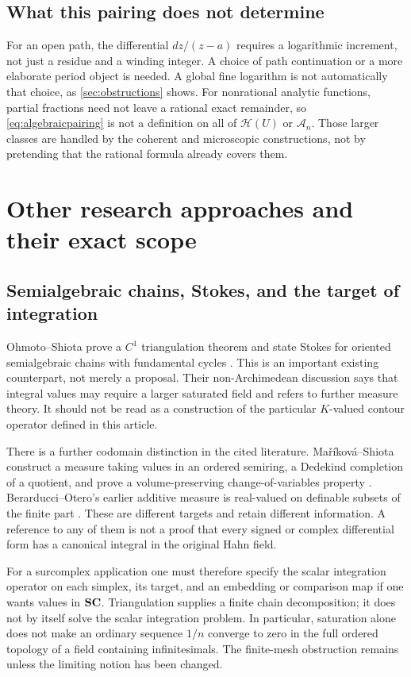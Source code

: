 \documentclass[11pt,letterpaper]{article}
\theoremstyle{definition}
\theoremstyle{remark}
\newcommand{\HH}{\mathcal H}\newcommand{\A}{\mathscr A}\newcommand{\OO}{\mathcal O}
\numberwithin{equation}{section}
\begin{document}
\subsection{What this pairing does not determine}
For an open path, the differential $dz/(z-a)$ requires a logarithmic increment, not just a residue and a winding integer. A choice of path continuation or a more elaborate period object is needed. A global fine logarithm is not automatically that choice, as \cref{sec:obstructions} shows. For nonrational analytic functions, partial fractions need not leave a rational exact remainder, so \eqref{eq:algebraicpairing} is not a definition on all of $\HH(U)$ or $\A_n$. Those larger classes are handled by the coherent and microscopic constructions, not by pretending that the rational formula already covers them.

\section{Other research approaches and their exact scope}\label{sec:alternatives}

\subsection{Semialgebraic chains, Stokes, and the target of integration}
Ohmoto--Shiota prove a $C^1$ triangulation theorem and state Stokes for oriented semialgebraic chains with fundamental cycles \cite[Theorem~4.1 and Proposition~4.2]{OS}. This is an important existing counterpart, not merely a proposal. Their non-Archimedean discussion says that integral values may require a larger saturated field and refers to further measure theory. It should not be read as a construction of the particular $K$-valued contour operator defined in this article.

There is a further codomain distinction in the cited literature. Ma\v r\'{i}kov\'{a}--Shiota construct a measure taking values in an ordered semiring, a Dedekind completion of a quotient, and prove a volume-preserving change-of-variables property \cite{MS}. Berarducci--Otero's earlier additive measure is real-valued on definable subsets of the finite part \cite{BOmeasure}. These are different targets and retain different information. A reference to any of them is not a proof that every signed or complex differential form has a canonical integral in the original Hahn field.

For a surcomplex application one must therefore specify the scalar integration operator on each simplex, its target, and an embedding or comparison map if one wants values in $\mathbf{SC}$. Triangulation supplies a finite chain decomposition; it does not by itself solve the scalar integration problem. In particular, saturation alone does not make an ordinary sequence $1/n$ converge to zero in the full ordered topology of a field containing infinitesimals. The finite-mesh obstruction remains unless the limiting notion has been changed.
\end{document}
